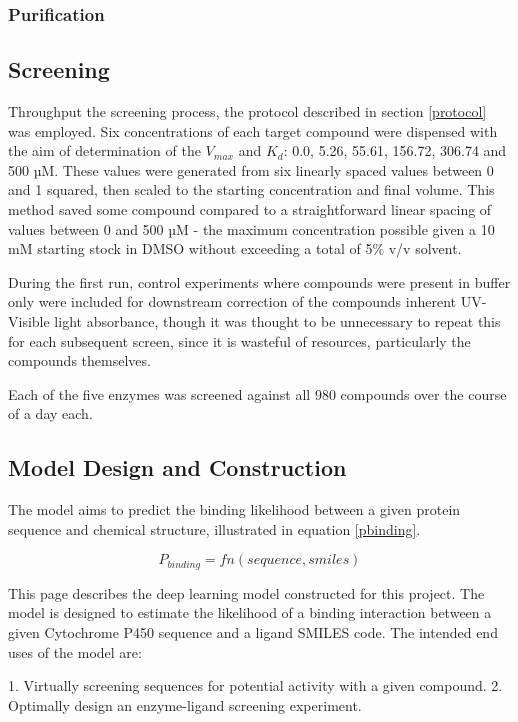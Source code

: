 \documentclass{article}
\begin{document}
\subsubsection{Purification}

\subsection{Screening}

Throughput the screening process, the protocol described in section \ref{protocol} was employed.
Six concentrations of each target compound were dispensed with the aim of determination of the $V_{max}$ and $K_d$: 0.0, 5.26, 55.61, 156.72, 306.74 and 500 µM.
These values were generated from six linearly spaced values between 0 and 1 squared, then scaled to the starting concentration and final volume.
This method saved some compound compared to a straightforward linear spacing of values between 0 and 500 µM - the maximum concentration possible given a 10 mM starting stock in DMSO without exceeding a total of 5\% v/v solvent.
\par
During the first run, control experiments where compounds were present in buffer only were included for downstream correction of the compounds inherent UV-Visible light absorbance, though it was thought to be unnecessary to repeat this for each subsequent screen, since it is wasteful of resources, particularly the compounds themselves.

Each of the five enzymes was screened against all 980 compounds over the course of a day each.




\subsection{Model Design and Construction}

The model aims to predict the binding likelihood between a given protein sequence and chemical structure, illustrated in equation \ref{pbinding}.

\label{pbinding}
$$
P_{binding} = fn(sequence, smiles)
$$

This page describes the deep learning model constructed for this project.
The model is designed to estimate the likelihood of a binding interaction between a given Cytochrome P450 sequence and a ligand SMILES code.
The intended end uses of the model are:

1. Virtually screening sequences for potential activity with a given compound.
2. Optimally design an enzyme-ligand screening experiment.
\end{document}
